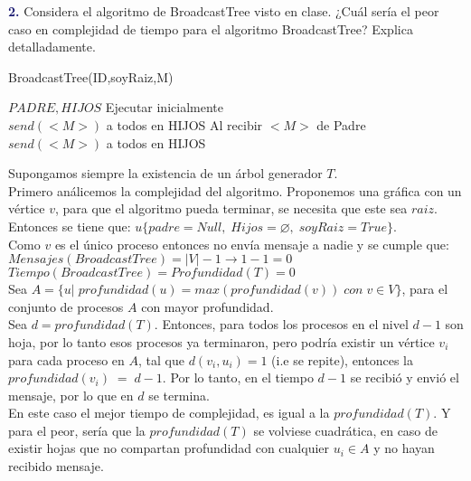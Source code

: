 \newpage
\textbf{\textcolor{MidnightBlue}{2.}}
 Considera el algoritmo de BroadcastTree visto en clase.
 ¿Cuál sería el peor caso en complejidad de tiempo para
 el algoritmo BroadcastTree? Explica detalladamente.\\

 \begin{algorithm}
\caption{BroadcastTree(ID,soyRaiz,M)}\label{alg:cap}
\begin{algorithmic}[1]
\State $PADRE, HIJOS$
\State Ejecutar inicialmente\\
    \State $send(<M>)$ a todos en HIJOS
\EndIf
\State Al recibir $<M>$ de Padre
\State $send(<M>)$ a todos en HIJOS
\end{algorithmic}
\end{algorithm}

Supongamos siempre la existencia de un árbol generador $T$.\\
Primero análicemos la complejidad del algoritmo.
Proponemos una gráfica con un vértice $v$, para que el algoritmo pueda terminar,
se necesita que este sea $raiz$. Entonces se tiene que:
$u \{ padre=Null,\; Hijos= \varnothing, \; soyRaiz=True \}$.\\

Como $v$ es el único proceso entonces no envía mensaje a nadie y se cumple que:\\
$Mensajes(BroadcastTree)=|V|-1 \rightarrow 1-1 = 0$\\
$Tiempo(BroadcastTree)= Profundidad(T)=0$\\

Sea $A=\{ u|\; profundidad(u) = max(profundidad(v))\; con \; v\in V\}$, para el
conjunto de procesos $A$ con mayor profundidad.\\
Sea $d=profundidad(T)$. Entonces, para todos los procesos en el nivel $d-1$ son
hoja, por lo tanto esos procesos ya terminaron, pero podría existir un vértice
$v_i$ para cada proceso en $A$, tal que $d(v_i,u_i)=1$ (i.e se repite), entonces la
$profundidad(v_i)\;=\;d-1$. Por lo tanto, en el tiempo $d-1$ se recibió y envió
el mensaje, por lo que en $d$ se termina.\\
En este caso el mejor tiempo de complejidad, es igual a la $profundidad(T)$.
Y para el peor, sería que la $profundidad(T)$ se volviese cuadrática, en caso
de existir hojas que no compartan profundidad con cualquier $u_i\in A$ y no
hayan recibido mensaje.

